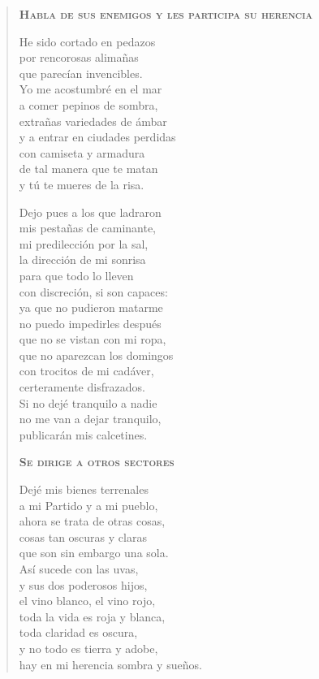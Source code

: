 \documentclass[12pt]{article}
\begin{document}
\begin{verse}
{\bfseries\scshape {Habla de sus enemigos y les participa su herencia}}

He sido cortado en pedazos\\
por rencorosas alimañas\\
que parecían invencibles.\\
Yo me acostumbré en el mar\\
a comer pepinos de sombra,\\
extrañas variedades de ámbar\\
y a entrar en ciudades perdidas\\
con camiseta y armadura\\
de tal manera que te matan\\
y tú te mueres de la risa.  

Dejo pues a los que ladraron\\
mis pestañas de caminante,\\
mi predilección por la sal,\\
la dirección de mi sonrisa\\
para que todo lo lleven\\
con discreción, si son capaces:\\
ya que no pudieron matarme\\
no puedo impedirles después\\
que no se vistan con mi ropa,\\
que no aparezcan los domingos\\
con trocitos de mi cadáver,\\
certeramente disfrazados.\\
Si no dejé tranquilo a nadie\\
no me van a dejar tranquilo,\\
publicarán mis calcetines.  

{\bfseries\scshape {Se dirige a otros sectores}}

Dejé mis bienes terrenales\\
a mi Partido y a mi pueblo,\\
ahora se trata de otras cosas,\\
cosas tan oscuras y claras\\
que son sin embargo una sola.\\
Así sucede con las uvas,\\
y sus dos poderosos hijos,\\
el vino blanco, el vino rojo,\\
toda la vida es roja y blanca,\\
toda claridad es oscura,\\
y no todo es tierra y adobe,\\
hay en mi herencia sombra y sueños.  


\end{verse}
\end{document}
